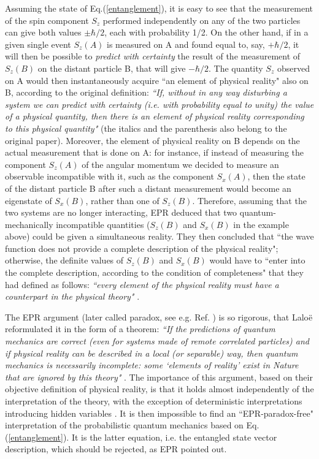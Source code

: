\documentclass[aps,prl,showkeys,showpacs,preprint,groupedaddress,12pt]{revtex4}
\begin{document}
Assuming the state of Eq.(\ref{entanglement}), it is easy to see
that the measurement of the spin component $S_z$ performed
independently on any of the two particles can give both values
$\pm\hbar/2$, each with probability 1/2. On the other hand, if in
a given single event $S_z(A)$ is measured on A and found equal to,
say, $+\hbar/2$, it will then be possible to {\it predict with
certainty} the result of the measurement of $S_z(B)$ on the
distant particle B, that will give $-\hbar/2$. The quantity $S_z$
observed on A would then instantaneously acquire ``an element of
physical reality" also on B, according to the original definition:
{\it ``If, without in any way disturbing a system we can predict
with certainty (i.e. with probability equal to unity) the value
of a physical quantity, then there is an element of physical
reality corresponding to this physical quantity"} \cite{EPR} (the
italics and the parenthesis also belong to the original paper).
Moreover, the element of physical reality on B depends on the
actual measurement that is done on A: for instance, if instead of
measuring the component $S_z(A)$ of the angular momentum we
decided to measure an observable incompatible with it, such as the
component $S_x(A)$, then the state of the distant particle B after
such a distant measurement would become an eigenstate of $S_x(B)$,
rather than one of $S_z(B)$. Therefore, assuming that the two
systems are no longer interacting, EPR deduced that two
quantum-mechanically incompatible quantities ($S_z(B)$ and
$S_x(B)$ in the example above) could be given a simultaneous
reality. They then concluded that ``the wave function does not
provide a complete description of the physical reality";
otherwise, the definite values of $S_z(B)$ and $S_x(B)$ would have
to ``enter into the complete description, according to the
condition of completeness" that they had defined as follows: {\it
``every element of the physical reality must have a counterpart in
the physical theory"} \cite{EPR}.

The EPR argument (later called paradox, see e.g. Ref.
\cite{Einstein}) is so rigorous, that Lalo\"e reformulated it in
the form of a theorem: {\it ``If the predictions of quantum
mechanics are correct (even for systems made of remote correlated
particles) and if physical reality can be described in a local (or
separable) way, then quantum mechanics is necessarily incomplete:
some `elements of reality' exist in Nature that are ignored by
this theory"} \cite{Laloe}. The importance of this argument, based
on their objective definition of physical reality, is that it
holds almost independently of the interpretation of the theory,
with the exception of deterministic interpretations introducing
hidden variables \cite{Laloe}. It is then impossible to find an
``EPR-paradox-free" interpretation of the probabilistic quantum
mechanics based on Eq. (\ref{entanglement}). It is the latter
equation, i.e. the entangled state vector description, which
should be rejected, as EPR pointed out.
\end{document}
